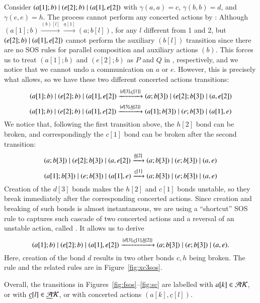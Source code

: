 {{\begin{example}\label{ex:concert3}
{\rm Consider $(a[1];b)\; \vert \; (e[2];b)\; \vert \; (a[1],e[2])$ with $\gamma(a,a)=c$, $\gamma(b,b)=d$, and
$\gamma(e,e)=h$.
The process cannot perform any concerted actions by : Although $(a[1];b)  \xrightarrow{(b)[l]} 
\xrightarrow{\underline{a}[1]} (a;b[l])$, for any $l$ different from 1 and 2, but
$(e[2];b)\; \vert \; (a[1],e[2])$  cannot perform the auxiliary $(b[l])$
transition since there are no SOS rules for parallel composition and auxiliary actions $(b)$. This forces us
to treat $(a[1];b)$ and $ (e[2];b)$ as $P$ and $Q$ in , respectively, and we notice that
we cannot undo a communication on $a$ or $e$. However, this is precisely what  allows, so we have these two different concerted actions transitions:
$$
(a[1];b)\; \vert \; (e[2];b)\; \vert \; (a[1],e[2])  \xrightarrow{\{d[3], \underline{c}[1]\}} 
(a;b[3])\; \vert \; (e[2];b[3])\; \vert \; (a,e[2])
$$ 
$$
(a[1];b)\; \vert \; (e[2];b)\; \vert \; (a[1],e[2])  \xrightarrow{\{d[3], \underline{h}[2]\}} 
(a[1];b[3])\; \vert \; (e;b[3])\; \vert \; (a[1],e)
$$ 
We notice that, following the first transition above, the $h[2]$ bond can be broken, and correspondingly the $c[1]$ bond can be broken after the second transition:
$$
(a;b[3])\; \vert \; (e[2];b[3])\; \vert \; (a,e[2]) \xrightarrow{\underline{h}[2]}  (a;b[3])\; \vert \; (e;b[3])\; \vert \; (a,e)
$$ 
$$
(a[1];b[3])\; \vert \; (e;b[3])\; \vert \; (a[1],e)  \xrightarrow{\underline{c}[1]} (a;b[3])\; \vert \; (e;b[3])\; \vert \; (a,e) 
$$ 
Creation of the $d[3]$ bonds makes the $h[2]$ and $c[1]$ bonds unstable, so they break immediately
after the corresponding concerted actions. Since creation and breaking of such bonds is almost instantaneous, we are using
a ``shortcut'' SOS rule to captures such cascade of two concerted actions and a reversal of an unstable action, called . It allows us to derive
$$
(a[1];b)\; \vert \; (e[2];b)\; \vert \; (a[1],e[2])  \xrightarrow{\{d[3], \underline{c}[1], \underline{h}[2]\}} 
(a;b[3])\; \vert \; (e;b[3])\; \vert \; (a,e) .
$$ 
Here, creation of the bond $d$ results in two other bonds $c, h$ being broken. The rule  and the related rules
are in Figure~\ref{fig:xc3sos}.}
\end{example}
}


Overall, the transitions in Figures~\ref{fig:fsos}--\ref{fig:sc} are labelled with $a[k] \in \mathcal{AK}$, or with 
$\underline{c}[l] \in \underline{\mathcal{A}}\mathcal{K}$, or with concerted actions $(a[k], \underline{c}[l])$.

}
